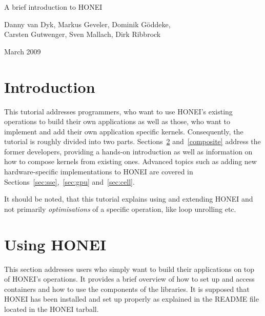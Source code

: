 \documentclass{article}
\begin{document}
\lstset{language=c++}
\lstset{breaklines=true}
\lstset{basicstyle=\small}

\begin{center}
{\huge
A brief introduction to HONEI}

\vspace*{1cm}

{\large Danny van Dyk, Markus Geveler, Dominik G\"oddeke, \\ Carsten Gutwenger, Sven Mallach, Dirk Ribbrock}

\vspace*{1cm}

{March 2009}

\vspace*{5cm}
\end{center}

\tableofcontents

\newpage

\section{Introduction}
This tutorial addresses programmers, who want to use HONEI's existing operations to build their own applications as well as those, who want to implement and add their own application specific kernels. Consequently, the tutorial is roughly divided into two parts. Sections~\ref{using} and~\ref{composite} address the former developers, providing a hands-on introduction as well as information on how to compose kernels from existing ones. Advanced topics such as adding new hardware-specific implementations to HONEI are covered in Sections~\ref{sec:sse},~\ref{sec:gpu} and~\ref{sec:cell}.

It should be noted, that this tutorial explains using and extending HONEI and not primarily \emph{optimisations} of a specific operation, like loop unrolling etc.

\FloatBarrier
\section{Using HONEI}\label{using}

This section addresses users who simply want to build their applications on top of HONEI's operations. It provides a brief overview of how to set up and access containers and how to use the components of the libraries. It is supposed that HONEI has been installed and set up properly as explained in the README file located in the HONEI tarball.
\end{document}

